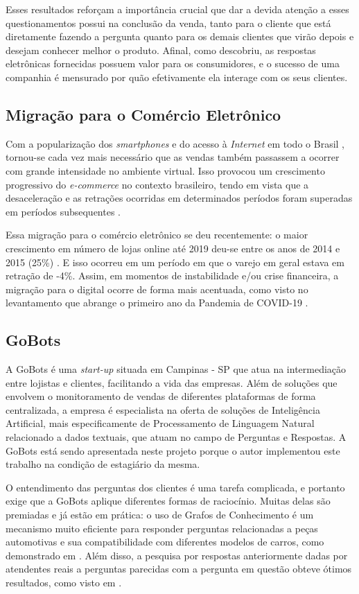 Esses resultados reforçam a importância crucial que dar a devida atenção a esses questionamentos possui na conclusão da venda, tanto para o cliente que está diretamente fazendo a pergunta quanto para os demais clientes que virão depois e desejam conhecer melhor o produto. Afinal, como \cite{singh} descobriu, as respostas eletrônicas fornecidas possuem valor para os consumidores, e o sucesso de uma companhia é mensurado por quão efetivamente ela interage com os seus clientes.

\subsection{Migração para o Comércio Eletrônico}
Com a popularização dos \textit{smartphones} e do acesso à \textit{Internet} em todo o Brasil \cite{internet_brasil}, tornou-se cada vez mais necessário que as vendas também passassem a ocorrer com grande intensidade no ambiente virtual. Isso provocou um crescimento progressivo do \textit{e-commerce} no contexto brasileiro, tendo em vista que a desaceleração e as retrações ocorridas em determinados períodos foram superadas em períodos subsequentes \cite{bagatini}.

Essa migração para o comércio eletrônico se deu recentemente: o maior crescimento em número de lojas online até 2019 deu-se entre os anos de 2014 e 2015 (25\%) \cite{bagatini}. E isso ocorreu em um período em que o varejo em geral estava em retração de -4\%. Assim, em momentos de instabilidade e/ou crise financeira, a migração para o digital ocorre de forma mais acentuada, como visto no levantamento que abrange o primeiro ano da Pandemia de COVID-19 \cite{ebit}.

\subsection{GoBots}
\label{gobots}
A GoBots é uma \textit{start-up} situada em Campinas - SP que atua na intermediação entre lojistas e clientes, facilitando a vida das empresas. Além de soluções que envolvem o monitoramento de vendas de diferentes plataformas de forma centralizada, a empresa é especialista na oferta de soluções de Inteligência Artificial, mais especificamente de Processamento de Linguagem Natural relacionado a dados textuais, que atuam no campo de Perguntas e Respostas. A GoBots está sendo apresentada neste projeto porque o autor implementou este trabalho na condição de estagiário da mesma.

O entendimento das perguntas dos clientes é uma tarefa complicada, e portanto exige que a GoBots aplique diferentes formas de raciocínio. Muitas delas são premiadas e já estão em prática: o uso de Grafos de Conhecimento é um mecanismo muito eficiente para responder perguntas relacionadas a peças automotivas e sua compatibilidade com diferentes modelos de carros, como demonstrado em \cite{kg}. Além disso, a pesquisa por respostas anteriormente dadas por atendentes reais a perguntas parecidas com a pergunta em questão obteve ótimos resultados, como visto em \cite{df}.

